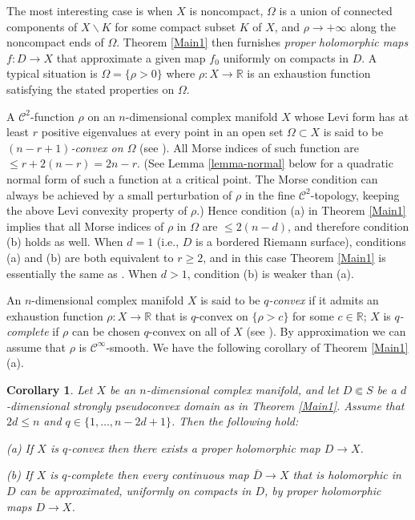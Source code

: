 \documentclass[11pt]{amsart}
\numberwithin{equation}{section}
\newtheorem{corollary}[theorem]{Corollary}
\theoremstyle{definition}
\begin{document}
The most interesting case is when $X$ is noncompact, $\Omega$ 
is a union of connected components of $X{\backslash} K$ for some compact subset $K$
of $X$, and $\rho\to +\infty$ along the noncompact ends of $\Omega$. 
Theorem  \ref{Main1} then furnishes
{\em proper holomorphic maps} $f\colon D\to X$ that approximate 
a given map $f_0$ uniformly on compacts in $D$.
A typical situation is $\Omega=\{\rho>0\}$ where $\rho\colon X\to {\mathbb{R}}$
is an exhaustion function satisfying the stated properties
on $\Omega$.

A ${\mathcal{C}}^2$-function $\rho$ on an $n$-dimensional complex manifold $X$
whose Levi form has at least $r$ positive eigenvalues
at every point in an open set $\Omega\subset X$ 
is said to be {\em $(n-r+1)$-convex on $\Omega$} (see \cite{Grauert2}). 
All Morse indices of such function are $\le r+2(n-r)=2n-r$. 
(See Lemma \ref{lemma-normal} below for a quadratic normal form of such a function
at a critical point. The Morse condition can always be achieved by a 
small perturbation of $\rho$ in the fine ${\mathcal{C}}^2$-topology, keeping the above 
Levi convexity property of $\rho$.)
Hence condition (a) in Theorem \ref{Main1} implies that all 
Morse indices of $\rho$ in $\Omega$ are $\le 2(n-d)$, and therefore condition (b) 
holds as well. When $d=1$ (i.e., $D$ is a bordered Riemann surface),
conditions (a) and (b) are both equivalent to $r\ge 2$, and in this case 
Theorem \ref{Main1} is essentially the same as \cite[Theorem 1.1]{BDF1}. 
When $d>1$, condition (b) is weaker than (a).

An $n$-dimensional complex manifold $X$ is 
said to be {\em $q$-convex} if it admits an exhaustion
function $\rho\colon X\to {\mathbb{R}}$ that is $q$-convex on 
$\{\rho>c\}$ for some $c\in{\mathbb{R}}$;
$X$ is {\em $q$-complete} if $\rho$ can be chosen 
$q$-convex on all of $X$ (see \cite{AG,Grauert2}). 
By approximation we can assume that $\rho$ is 
${\mathcal{C}}^\infty$-smooth. We have the following 
corollary of Theorem \ref{Main1} (a).

\begin{corollary}
\label{q-complete}
Let $X$ be an $n$-dimensional complex manifold,
and let $D\Subset S$ be a $d$-dimensional strongly pseudoconvex domain as in 
Theorem \ref{Main1}. Assume that $2d \le n$ and 
$q\in \{1,\ldots, n-2d+1\}$. Then the following hold:

(a) If $X$ is $q$-convex then there exists a proper holomorphic
map $D \to X$. 

(b) If $X$ is $q$-complete then every continuous map  $\bar D\to X$ that 
is holomorphic in $D$ can be approximated, uniformly on compacts 
in $D$, by proper holomorphic maps $D\to X$.
\end{corollary}
\end{document}

